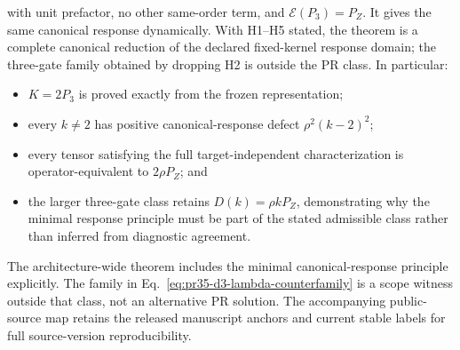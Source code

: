 with unit prefactor, no other same-order term, and $\mathcal E(P_3)=P_Z$.  It gives the same canonical response dynamically. With H1--H5 stated, the theorem is a complete canonical reduction of the declared fixed-kernel response domain; the three-gate family obtained by dropping H2 is outside the PR class.
\thispagestyle{fancy}
In particular:
\begin{itemize}
 \item $K=2P_3$ is proved exactly from the frozen representation;
 \item every $k\ne2$ has positive canonical-response defect
 $\rho^2(k-2)^2$;
 \item every tensor satisfying the full target-independent characterization
 is operator-equivalent to $2\rho P_Z$; and
 \item the larger three-gate class retains $D(k)=\rho kP_Z$, demonstrating
 why the minimal response principle must be part of the stated admissible
 class rather than inferred from diagnostic agreement.
\end{itemize}
The architecture-wide theorem includes the minimal canonical-response principle explicitly.  The family in Eq.~\eqref{eq:pr35-d3-lambda-counterfamily} is a scope witness outside that class, not an alternative PR solution. The accompanying public-source map retains the released manuscript anchors and current stable labels for full source-version reproducibility.
